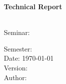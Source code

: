 
\vfill
\huge \sffamily \bfseries
Technical Report	\\[0.2cm]
\\[2cm]
\begin{center}\Titel\end{center}

\vfill
\normalsize
Seminar:	                \vspace{0.2cm}\\
\SeminarName                \vspace{0.5cm}
 
Semester: \SemesterYear     \vspace{0.2cm}\\
Date: \today                \vspace{0.2cm}\\
Version: \VersNrT     		\vspace{2cm}  \\                           

Author: \Autor

\vfill
\sffamily \bfseries

\rmfamily \normalfont
\vfill
\cleardoublepage

\ofoot[\pagemark]{\pagemark}
